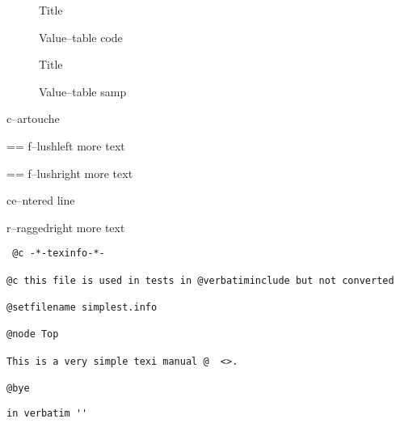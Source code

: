 \documentclass{book}
\makeatletter
\newcommand\Texinfotablestylesamp[1]{\ifstrempty{#1}{}{`\texttt{#1}'}}%
\newenvironment{Texinfopreformatted}{%
  \par\GNUTobeylines\obeyspaces\frenchspacing\parskip=\z@\parindent=\z@}{}
{\catcode`\^^M=13 \gdef\GNUTobeylines{\catcode`\^^M=13 \def^^M{\null\par}}}
\renewcommand{\_}{\Texinfounderscore\discretionary{}{}{}}
\makeatother
\begin{document}
\begin{description}
\item[] Title
\item[{\parbox[b]{\linewidth}{%
\texttt{a{-}{-}code}}}]
Value--table code
\end{description}

\begin{description}
\item[] Title
\item[{\parbox[b]{\linewidth}{%
\Texinfotablestylesamp{a{-}{-}samp}\\
\Texinfotablestylesamp{a2{-}{-}samp}}}]
Value--table samp
\end{description}

\begin{mdframed}[style=Texinfocartouche]
c--artouche
\end{mdframed}

\begin{flushleft}
\begin{Texinfopreformatted}%
f--lushleft
more text
\end{Texinfopreformatted}
\end{flushleft}

\begin{flushright}
\begin{Texinfopreformatted}%
f--lushright
more text
\end{Texinfopreformatted}
\end{flushright}

\begin{center}
ce--ntered line
\end{center}

\begin{flushleft}
r--raggedright
more text
\end{flushleft}

\begin{verbatim}
 @c -*-texinfo-*-

@c this file is used in tests in @verbatiminclude but not converted

@setfilename simplest.info

@node Top

This is a very simple texi manual @  <>.

@bye
\end{verbatim}

\begin{verbatim}
in verbatim ''
\end{verbatim}
\end{document}
